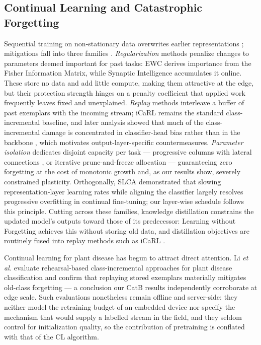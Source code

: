 \documentclass[journal]{IEEEtran}
\begin{document}
\subsection{Continual Learning and Catastrophic Forgetting}

Sequential training on non-stationary data overwrites earlier representations
\cite{ref13}; mitigations fall into three families \cite{ref14}.
\emph{Regularization} methods penalize changes to parameters deemed important for
past tasks: EWC \cite{ref15} derives importance from the Fisher Information Matrix,
while Synaptic Intelligence \cite{ref16} accumulates it online. These store no data
and add little compute, making them attractive at the edge, but their protection
strength hinges on a penalty coefficient that applied work frequently leaves fixed
and unexplained. \emph{Replay} methods interleave a buffer of past exemplars with
the incoming stream; iCaRL \cite{ref17} remains the standard class-incremental
baseline, and later analysis showed that much of the class-incremental damage is
concentrated in classifier-head bias rather than in the backbone \cite{ref18},
which motivates output-layer-specific countermeasures. \emph{Parameter isolation}
dedicates disjoint capacity per task --- progressive columns with lateral
connections \cite{ref19}, or iterative prune-and-freeze allocation \cite{ref20} ---
guaranteeing zero forgetting at the cost of monotonic growth and, as our results
show, severely constrained plasticity. Orthogonally, SLCA \cite{ref23} demonstrated
that slowing representation-layer learning rates while aligning the classifier
largely resolves progressive overfitting in continual fine-tuning; our layer-wise
schedule follows this principle. Cutting across these families, knowledge distillation
constrains the updated model's outputs toward those of its predecessor: Learning
without Forgetting \cite{ref29} achieves this without storing old data, and
distillation objectives are routinely fused into replay methods such as
iCaRL \cite{ref17}.

Continual learning for plant disease has begun to attract direct attention. Li
\emph{et al.} \cite{ref24} evaluate rehearsal-based class-incremental approaches for
plant disease classification and confirm that replaying stored exemplars materially
mitigates old-class forgetting --- a conclusion our CatB results independently
corroborate at edge scale. Such evaluations nonetheless remain offline and
server-side: they neither model the retraining budget of an embedded device nor
specify the mechanism that would supply a labelled stream in the field, and they
seldom control for initialization quality, so the contribution of pretraining is
conflated with that of the CL algorithm.
\end{document}
